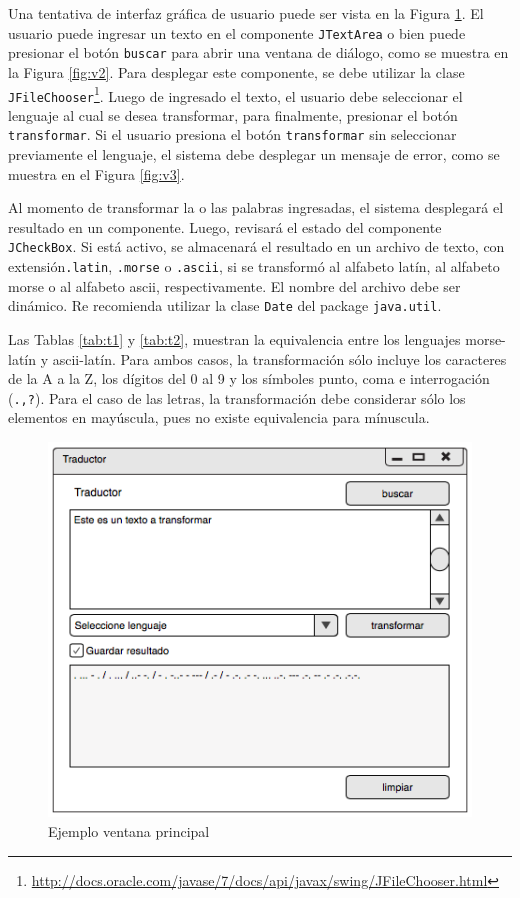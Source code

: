 \documentclass[a4paper,10pt]{article}
\theoremstyle{mytheor}
\begin{document}
Una tentativa de interfaz gr\'afica de usuario puede ser vista en la Figura \ref{fig:v1}. El usuario puede ingresar un texto en el componente \texttt{JTextArea} o bien puede presionar el bot\'on \texttt{buscar} para abrir una ventana de di\'alogo, como se muestra en la Figura \ref{fig:v2}. Para desplegar este componente, se debe utilizar la clase \texttt{JFileChooser}\footnote{\url{http://docs.oracle.com/javase/7/docs/api/javax/swing/JFileChooser.html}}. Luego de ingresado el texto, el usuario debe seleccionar el lenguaje al cual se desea transformar, para finalmente, presionar el bot\'on \texttt{transformar}. Si el usuario presiona el bot\'on \texttt{transformar} sin seleccionar previamente el lenguaje, el sistema debe desplegar un mensaje de error, como se muestra en el Figura \ref{fig:v3}.

Al momento de transformar la o las palabras ingresadas, el sistema desplegar\'a el resultado en un componente. Luego, revisar\'a el estado del componente \texttt{JCheckBox}. Si est\'a activo, se almacenar\'a el resultado en un archivo de texto, con extensi\'on\texttt{.latin}, \texttt{.morse} o \texttt{.ascii}, si se transform\'o al alfabeto lat\'in, al alfabeto morse o al alfabeto ascii, respectivamente. El nombre del archivo debe ser din\'amico. Re recomienda utilizar la clase \texttt{Date} del package \texttt{java.util}.

Las Tablas \ref{tab:t1} y \ref{tab:t2}, muestran la equivalencia entre los lenguajes morse-lat\'in y ascii-lat\'in. Para ambos casos, la transformaci\'on s\'olo incluye los caracteres de la A a la Z, los d\'igitos del 0 al 9 y los s\'imboles punto, coma e interrogaci\'on (\texttt{.,?}). Para el caso de las letras, la transformaci\'on debe considerar s\'olo los elementos en may\'uscula, pues no existe equivalencia para m\'inuscula. %

\begin{figure}[H]
    \begin{center}
        \caption{Ejemplo ventana principal}\label{fig:v1}
        \includegraphics[scale=.65]{v1.png}
    \end{center}
\end{figure}
\end{document}
